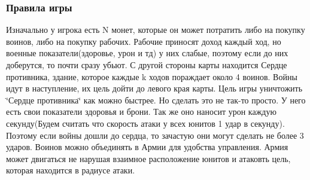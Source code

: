 \subsubsection*{Правила игры}

Изначально у игрока есть N монет, которые он может потратить либо на покупку воинов, либо на покупку рабочих. Рабочие приносят доход каждый ход, но военные показатели(здоровье, урон и тд) у них слабые, поэтому если до них доберутся, то почти сразу убьют. С другой стороны карты находится Сердце противника, здание, которое каждые k ходов пораждает около 4 воинов. Войны идут в наступление, их цель дойти до левого края карты. Цель игры уничтожить \char`\"{}Сердце противника\char`\"{} как можно быстрее. Но сделать это не так-\/то просто. У него есть свои показатели здоровья и брони. Так же оно наносит урон каждую секунду(Будем считать что скорость атаки у всех юнитов 1 удар в секунду). Поэтому если войны дошли до сердца, то зачастую они могут сделать не более 3 ударов. Воинов можно объединять в Армии для удобства управления. Армия может двигаться не нарушая взаимное расположение юнитов и атаковть цель, которая находится в радиусе атаки.